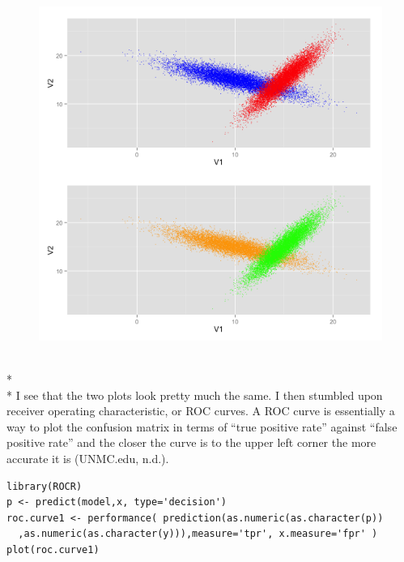 \documentclass[10pt]{article}
\begin{document}
\begin{figure}[!h]
\includegraphics[scale=0.37]{rdVsPred.png}
\centering
\end{figure}\\*
\newpage\
\\* I see that the two plots look pretty much the same. I then stumbled upon receiver operating characteristic, or ROC curves. A ROC curve is essentially a way to plot the confusion matrix in terms of “true positive rate” against “false positive rate” and the closer the curve is to the upper left corner the more accurate it is (UNMC.edu, n.d.).  
\begin{verbatim}
library(ROCR) 
p <- predict(model,x, type='decision') 
roc.curve1 <- performance( prediction(as.numeric(as.character(p))
  ,as.numeric(as.character(y))),measure='tpr', x.measure='fpr' ) 
plot(roc.curve1) 
\end{verbatim}
\end{document}
